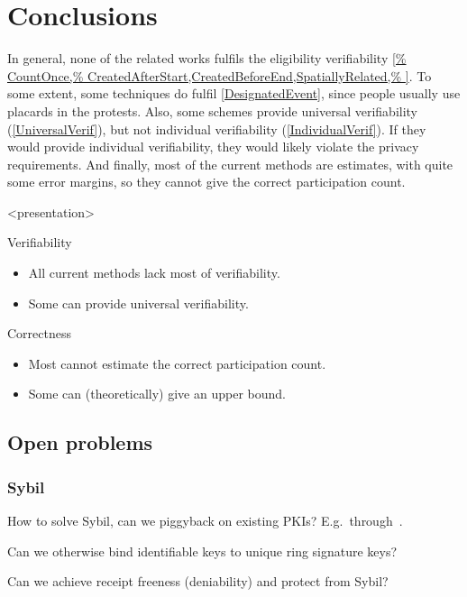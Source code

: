 \mode*
\section{Conclusions}


In general, none of the related works fulfils the eligibility verifiability 
\cref{%
  CountOnce,%
  CreatedAfterStart,CreatedBeforeEnd,SpatiallyRelated,%
}.
To some extent, some techniques do fulfil \cref{DesignatedEvent}, since people 
usually use placards in the protests.
Also, some schemes provide universal verifiability (\cref{UniversalVerif}), but 
not individual verifiability (\cref{IndividualVerif}).
If they would provide individual verifiability, they would likely violate the 
privacy requirements.
And finally, most of the current methods are estimates, with quite some error 
margins, so they cannot give the correct participation count.

\begin{frame}<presentation>
  \begin{block}{Verifiability}
    \begin{itemize}
      \item All current methods lack most of verifiability.
      \item Some can provide universal verifiability.
    \end{itemize}
  \end{block}

  \pause{}

  \begin{block}{Correctness}
    \begin{itemize}
      \item Most cannot estimate the correct participation count.
      \item Some can (theoretically) give an upper bound.
    \end{itemize}
  \end{block}
\end{frame}

\subsection{Open problems}

\begin{frame}
  \frametitle{Sybil}
  \begin{question}
    How to solve Sybil, can we piggyback on existing \acp{PKI}?
    E.g.\ through~\cite{Cinderella}.
  \end{question}

  \begin{question}
    Can we otherwise bind identifiable keys to unique ring signature keys?
  \end{question}

  \begin{question}
    Can we achieve receipt freeness (deniability) and protect from Sybil?
  \end{question}
\end{frame}

